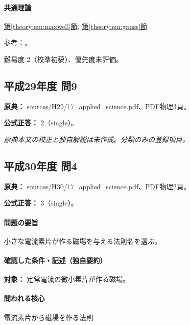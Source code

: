 \paragraph{共通理論} \hyperref[theory:em:maxwell]{第\ref*{theory:em:maxwell}節}, \hyperref[theory:em:gauss]{第\ref*{theory:em:gauss}節}

\par 参考：\cite{mit_em13}。

\par 難易度 2（校準初稿）、優先度未評価。

\subsection{平成29年度 問9}
\label{q:h29-reg-applied-09}

\noindent\textbf{原典：} sources/H29/17\_applied\_science.pdf、PDF物理3頁。

\textbf{公式正答：} 2（single）。

\par\textit{原典本文の校正と独自解説は未作成。分類のみの登録項目。}

\subsection{平成30年度 問4}
\label{q:h30-reg-applied-04}

\noindent\textbf{原典：} sources/H30/17\_applied\_science.pdf、PDF物理2頁。

\textbf{公式正答：} 3（single）。

\paragraph{問題の要旨} 小さな電流素片が作る磁場を与える法則名を選ぶ。

\paragraph{確認した条件・記述（独自要約）}\mbox{}\par

\noindent\textbf{対象：} 定常電流の微小素片が作る磁場。\par

\paragraph{問われる核心} 電流素片から磁場を作る法則

